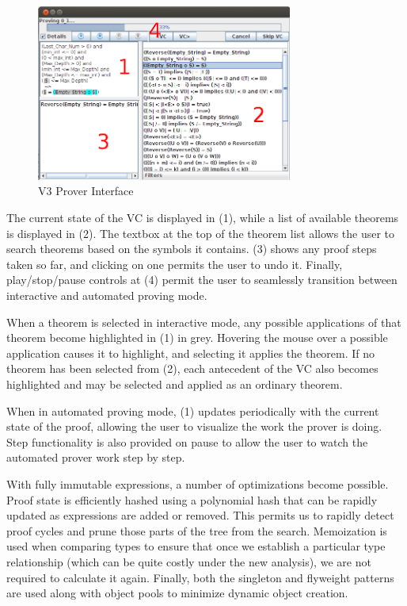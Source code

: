 \begin{figure}
  \centering
    \includegraphics[width=0.75\textwidth]{newProverInterface}
  \caption{V3 Prover Interface\label{newProverInterface}}
\end{figure}

The current state of the VC is displayed in (1), while a list of available theorems is displayed in (2).  The textbox at the top of the theorem list allows the user to search theorems based on the symbols it contains.  (3) shows any proof steps taken so far, and clicking on one permits the user to undo it.  Finally, play/stop/pause controls at (4) permit the user to seamlessly transition between interactive and automated proving mode.

When a theorem is selected in interactive mode, any possible applications of that theorem become highlighted in (1) in grey.  Hovering the mouse over a possible application causes it to highlight, and selecting it applies the theorem.  If no theorem has been selected from (2), each antecedent of the VC also becomes highlighted and may be selected and applied as an ordinary theorem.

When in automated proving mode, (1) updates periodically with the current state of the proof, allowing the user to visualize the work the prover is doing.  Step functionality is also provided on pause to allow the user to watch the automated prover work step by step.

With fully immutable expressions, a number of optimizations become possible.  Proof state is efficiently hashed using a polynomial hash that can be rapidly updated as expressions are added or removed.  This permits us to rapidly detect proof cycles and prune those parts of the tree from the search.  Memoization is used when comparing types to ensure that once we establish a particular type relationship (which can be quite costly under the new analysis), we are not required to calculate it again.  Finally, both the singleton and flyweight patterns are used along with object pools to minimize dynamic object creation.

